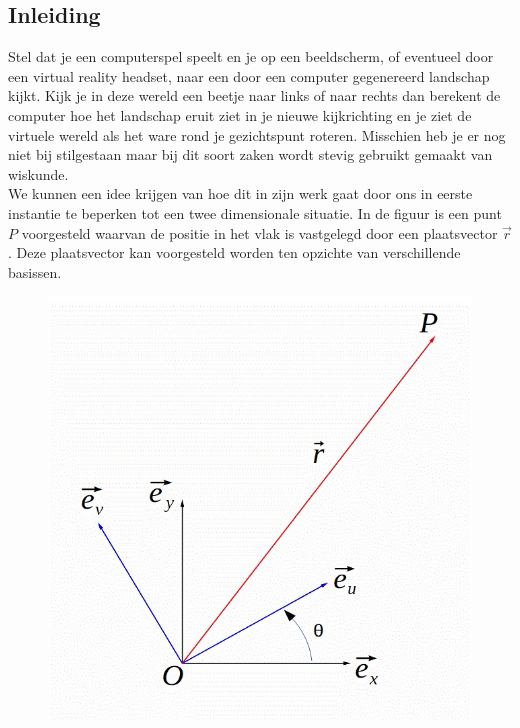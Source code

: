 \subsection*{Inleiding}

Stel dat je een computerspel speelt en je op een beeldscherm, of eventueel door een virtual reality headset, naar een door een computer gegenereerd landschap kijkt. Kijk je in deze wereld een beetje naar links of naar rechts dan berekent de computer hoe het landschap eruit ziet in je nieuwe kijkrichting en je ziet de virtuele wereld als het ware rond je gezichtspunt roteren. Misschien heb je er nog niet bij stilgestaan maar bij dit soort zaken wordt stevig gebruikt gemaakt van wiskunde.\\
We kunnen een idee krijgen van hoe dit in zijn werk gaat door ons in eerste instantie te beperken tot een twee dimensionale situatie. In de figuur is een punt $P$ voorgesteld waarvan de positie in het vlak is vastgelegd door een plaatsvector $\vec{r}$. Deze plaatsvector kan voorgesteld worden ten opzichte van verschillende basissen. 

\begin{figure}[h]
	\begin{center}
		\includegraphics[scale=0.5]{5_vglen_ongelijkheden_stelsels_matrices/inputs/matrices-fig-1}
	\end{center}
\end{figure}

